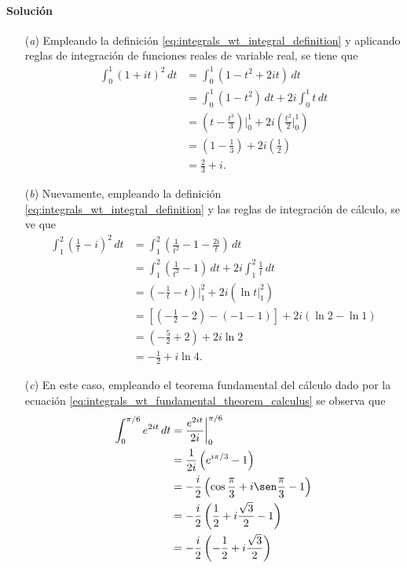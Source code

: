 \documentclass[a4paper]{report}
\begin{document}
\paragraph{Solución} 
\begin{enumerate}
 \item[(\textit{a})] Empleando la definición \ref{eq:integrals_wt_integral_definition} y aplicando reglas de integración de funciones reales de variable real, se tiene que 
 \begin{align*}
  \int_0^1(1+it)^2\,dt&=\int_0^1(1-t^2+2it)\,dt\\
   &=\int_0^1(1-t^2)\,dt+2i\int_0^1 t\,dt\\
   &=\left(t-\frac{t^3}{3}\right)\bigg|_0^1+2i\left(\frac{t^2}{2}\bigg|_0^1\right)\\
   &=\left(1-\frac{1}{3}\right)+2i\left(\frac{1}{2}\right)\\
   &=\frac{2}{3}+i.
 \end{align*}
 \item[(\textit{b})] Nuevamente, empleando la definición \ref{eq:integrals_wt_integral_definition} y las reglas de integración de cálculo, se ve que  
 \begin{align*}
  \int_1^2\left(\frac{1}{t}-i\right)^2\,dt&=\int_1^2\left(\frac{1}{t^2}-1-\frac{2i}{t}\right)\,dt\\
   &=\int_1^2\left(\frac{1}{t^2}-1\right)\,dt+2i\int_1^2\frac{1}{t}\,dt\\
   &=\left(-\frac{1}{t}-t\right)\bigg|_1^2+2i\left(\ln t\bigg|_1^2\right)\\
   &=\left[\left(-\frac{1}{2}-2\right)-\left(-1-1\right)\right]
    +2i\left(\ln2-\ln1\right)\\
   &=\left(-\frac{5}{2}+2\right)+2i\ln2\\
   &=-\frac{1}{2}+i\ln4.
 \end{align*}
 \item[(\textit{c})] En este caso, empleando el teorema fundamental del cálculo dado por la ecuación \ref{eq:integrals_wt_fundamental_theorem_calculus} se observa que 
 \begin{align*}
  \int_0^{\pi/6}e^{2it}\,dt&=\frac{e^{2it}}{2i}\bigg|_0^{\pi/6}\\
   &=\frac{1}{2i}\left(e^{i\pi/3}-1\right)\\
   &=-\frac{i}{2}\left(\cos\frac{\pi}{3}+i\sen\frac{\pi}{3}-1\right)\\
   &=-\frac{i}{2}\left(\frac{1}{2}+i\frac{\sqrt{3}}{2}-1\right)\\
   &=-\frac{i}{2}\left(-\frac{1}{2}+i\frac{\sqrt{3}}{2}\right)\\

\end{align*}
\end{enumerate}
\end{document}
